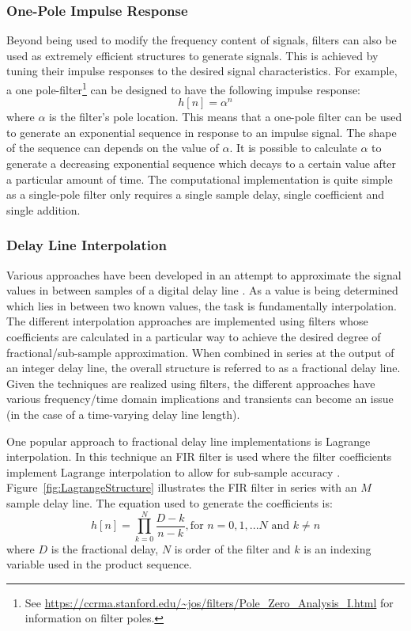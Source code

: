 \documentclass[main.tex]{subfiles}
\begin{document}
\subsubsection{One-Pole Impulse Response}
Beyond being used to modify the frequency content of signals, filters can also be used as extremely efficient structures to generate signals. This is achieved by tuning their impulse responses to the desired signal characteristics. For example, a one pole-filter\footnote{See \url{https://ccrma.stanford.edu/~jos/filters/Pole_Zero_Analysis_I.html} for information on filter poles.} can be designed to have the following impulse response:
\begin{equation}
    h[n] = \alpha^n
\end{equation}
where $\alpha$ is the filter's pole location. This means that a one-pole filter can be used to generate an exponential sequence in response to an impulse signal. The shape of the sequence can depends on the value of $\alpha$. It is possible to calculate $\alpha$ to generate a decreasing exponential sequence which decays to a certain value after a particular amount of time. The computational implementation is quite simple as a single-pole filter only requires a single sample delay, single coefficient and single addition.

\subsubsection{Delay Line Interpolation}
Various approaches have been developed in an attempt to approximate the signal values in between samples of a digital delay line . As a value is being determined which lies in between two known values, the task is fundamentally interpolation. The different interpolation approaches are implemented using filters whose coefficients are calculated in a particular way to achieve the desired degree of fractional/sub-sample approximation. When combined in series at the output of an integer delay line, the overall structure is referred to as a fractional delay line. Given the techniques are realized using filters, the different approaches have various frequency/time domain implications and transients can become an issue (in the case of a time-varying delay line length).

One popular approach to fractional delay line implementations is Lagrange interpolation. In this technique an FIR filter is used where the filter coefficients implement Lagrange interpolation to allow for sub-sample accuracy . Figure~\ref{fig:LagrangeStructure} illustrates the FIR filter in series with an $M$ sample delay line. The equation used to generate the coefficients is:
\begin{equation}
    h[n] = \prod_{k=0}^{N} \frac{D-k}{n-k}, \text{for } n=0, 1, ... N \text{ and } k \ne n
\end{equation}
where $D$ is the fractional delay, $N$ is order of the filter and $k$ is an indexing variable used in the product sequence.
\end{document}
